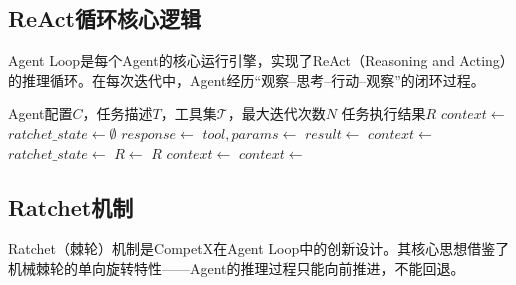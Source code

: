 \documentclass[12pt,a4paper]{ctexrep}
\begin{document}
\subsection{ReAct循环核心逻辑}

Agent Loop是每个Agent的核心运行引擎，实现了ReAct（Reasoning and Acting）\cite{react2023}的推理循环。在每次迭代中，Agent经历``观察--思考--行动--观察''的闭环过程。

\begin{algorithm}[H]
\caption{Agent Loop核心算法}
\label{alg:agent-loop}
\begin{algorithmic}[1]
\Require Agent配置$C$，任务描述$T$，工具集$\mathcal{T}$，最大迭代次数$N$
\Ensure 任务执行结果$R$
\State $context \gets$ 
\State $ratchet\_state \gets \emptyset$
    \State $response \gets$  
        \State $tool, params \gets$ 
        \State {} 
        \State $result \gets$ 
        \State $context \gets$ 
        \State $ratchet\_state \gets$ 
        \State $R \gets$ 
        \State {}
        \State \Return $R$
    \Else
        \State $context \gets$ 
    \EndIf
    \State $context \gets$  
\EndFor
\State \Return {}
\end{algorithmic}
\end{algorithm}

\subsection{Ratchet机制}

Ratchet（棘轮）机制是CompetX在Agent Loop中的创新设计。其核心思想借鉴了机械棘轮的单向旋转特性——Agent的推理过程只能向前推进，不能回退。
\end{document}
